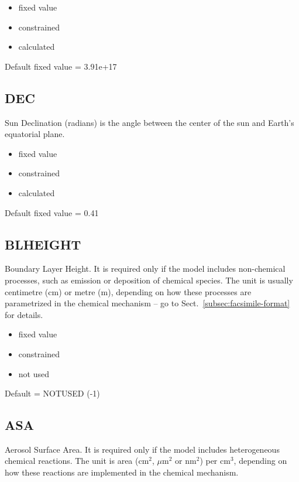 \begin{itemize}
\item fixed value
\item constrained
\item calculated
\end{itemize}

Default fixed value = 3.91e+17

\subsection{DEC} \label{subsec:dec}

Sun Declination (radians) is the angle between the center of the sun
and Earth's equatorial plane.

\begin{itemize}
\item fixed value
\item constrained
\item calculated
\end{itemize}

Default fixed value = 0.41

\subsection{BLHEIGHT} \label{subsec:blheight}

Boundary Layer Height. It is required only if the model includes
non-chemical processes, such as emission or deposition of chemical
species. The unit is usually centimetre (cm) or metre (m), depending
on how these processes are parametrized in the chemical mechanism --
go to Sect.~\ref{subsec:facsimile-format} for details.

\begin{itemize}
\item fixed value
\item constrained
\item not used
\end{itemize}

Default = NOTUSED (-1)

\subsection{ASA} \label{subsec:asa}

Aerosol Surface Area. It is required only if the model includes
heterogeneous chemical reactions. The unit is area (cm$^2$, $\mu$m$^2$
or nm$^2$) per cm$^3$, depending on how these reactions are
implemented in the chemical mechanism.

